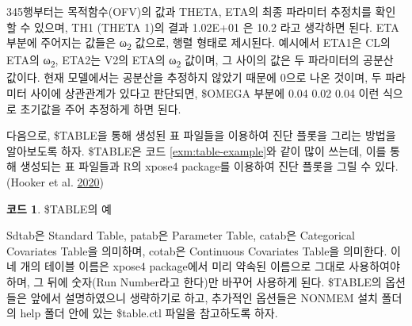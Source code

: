 \documentclass[
  11pt,
  krantz2,
  a4paper]{krantz}
\newenvironment{Shaded}{\begin{snugshade}}{\end{snugshade}}
\newcommand{\DecValTok}[1]{\textcolor[rgb]{0.00,0.00,0.81}{#1}}
\newcommand{\KeywordTok}[1]{\textcolor[rgb]{0.13,0.29,0.53}{\textbf{#1}}}
\newcommand{\NormalTok}[1]{#1}
\newcommand{\OperatorTok}[1]{\textcolor[rgb]{0.81,0.36,0.00}{\textbf{#1}}}
\theoremstyle{definition}
\theoremstyle{definition}
\newtheorem{example}{코드}[chapter]
\theoremstyle{definition}
\theoremstyle{remark}
\begin{document}
345행부터는 목적함수(OFV)의 값과 THETA, ETA의 최종 파라미터 추정치를 확인할 수 있으며, TH1 (THETA 1)의 결과 1.02E+01 은 10.2 라고 생각하면 된다. ETA 부분에 주어지는 값들은 ω\textsubscript{2} 값으로, 행렬 형태로 제시된다. 예시에서 ETA1은 CL의 ETA의 ω\textsubscript{2}, ETA2는 V2의 ETA의 ω\textsubscript{2} 값이며, 그 사이의 값은 두 파라미터의 공분산 값이다. 현재 모델에서는 공분산을 추정하지 않았기 때문에 0으로 나온 것이며, 두 파라미터 사이에 상관관계가 있다고 판단되면, \$OMEGA 부분에 0.04 0.02 0.04 이런 식으로 초기값을 주어 추정하게 하면 된다.

다음으로, \$TABLE을 통해 생성된 표 파일들을 이용하여 진단 플롯을 그리는 방법을 알아보도록 하자. \$TABLE은 코드 \ref{exm:table-example}와 같이 많이 쓰는데, 이를 통해 생성되는 표 파일들과 R의 xpose4 package를 이용하여 진단 플롯을 그릴 수 있다. (Hooker et al. \protect\hyperlink{ref-R-xpose4}{2020})


\begin{example}
\protect\hypertarget{exm:table-example}{}{\label{exm:table-example} }\$TABLE의 예
\end{example}

\small

\begin{Shaded}
\end{Shaded}

\normalsize

Sdtab은 Standard Table, patab은 Parameter Table, catab은 Categorical Covariates Table을 의미하며, cotab은 Continuous Covariates Table을 의미한다. 이 네 개의 테이블 이름은 xpose4 package에서 미리 약속된 이름으로 그대로 사용하여야 하며, 그 뒤에 숫자(Run Number라고 한다)만 바꾸어 사용하게 된다. \$TABLE의 옵션들은 앞에서 설명하였으니 생략하기로 하고, 추가적인 옵션들은 NONMEM 설치 폴더의 help 폴더 안에 있는 \$table.ctl 파일을 참고하도록 하자.
\end{document}
